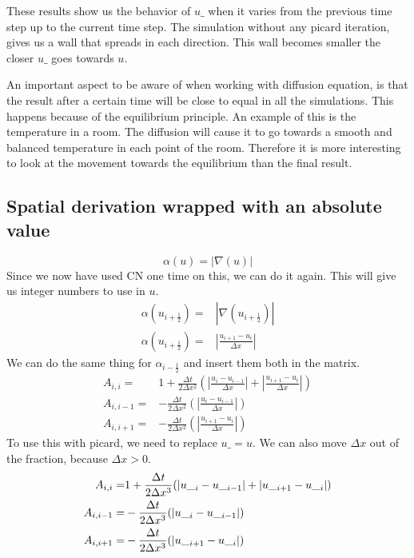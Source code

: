 \documentclass{book}
\begin{document}
These results show us the behavior of $u\_$ when it varies from the previous
time step up to the current time step. The simulation without any picard
iteration, gives us a wall that spreads in each direction. This wall becomes
smaller the closer $u\_$ goes towards $u$. 

An important aspect to be aware of when working with
diffusion equation, is that the result after a certain time will be close to  equal in all
the simulations. This happens because of the equilibrium principle. An example
of this is the temperature in a room. The diffusion will cause it to go towards a smooth and
balanced temperature in each point of the room. Therefore it is more interesting
to look at the movement towards the equilibrium than the final result.

\subsection{Spatial derivation wrapped with an absolute value}

\begin{equation}
\alpha(u) = |\nabla(u)|
\end{equation}
Since we now have used CN one time on this, we can do it again. This will give
us integer numbers to use in $u$.
\begin{align*}
\alpha(u_{i+\frac{1}{2}}) =& \left|\nabla(u_{i+\frac{1}{2}})\right|\\
\alpha(u_{i+\frac{1}{2}}) =& \left|\frac{u_{i+1}-u_i}{\Delta x}\right|
\end{align*}
We can do the same thing for $\alpha_{i-\frac{1}{2}}$ and insert them both in
the matrix.
\begin{align*} 
A_{i,i} =& 1+\frac{\Delta t}{2\Delta x^2}(\left|\frac{u_i-u_{i-1}}{\Delta x}\right|+ \left|\frac{u_{i+1}-u_i}{\Delta x}\right|)\\
A_{i,i-1} =&-\frac{\Delta t}{2\Delta x^2}(\left|\frac{u_i-u_{i-1}}{\Delta x}\right|)\\
A_{i,i+1} =&-\frac{\Delta t}{2\Delta x^2}(\left|\frac{u_{i+1}-u_i}{\Delta x}\right|)
\end{align*}                               
To use this with picard, we need to replace $u\_=u$. We can also move $\Delta x$
out of the fraction, because $\Delta x > 0$.
\begin{align} \label{eq:matrix_absolute}
A_{i,i} =& 1+\frac{\Delta t}{2\Delta x^3}(\left|u\__i-u\__{i-1}\right|+ \left|u\__{i+1}-u\__i\right|)\notag\\
A_{i,i-1} =&-\frac{\Delta t}{2\Delta x^3}(\left|u\__i-u\__{i-1}\right|)\notag\\
A_{i,i+1} =&-\frac{\Delta t}{2\Delta x^3}(\left|u\__{i+1}-u\__i\right|)
\end{align}                               
\end{document}
